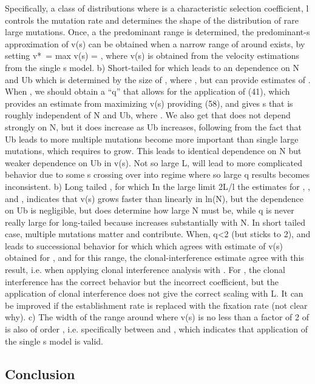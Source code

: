 \documentclass[12pt]{article}
\begin{document}
Specifically, a class of distributions where is a characteristic selection coefficient, l controls the mutation rate and determines the shape of the distribution of rare large mutations.
Once, a the predominant range is determined, the predominant-s approximation of v(s) can be obtained when a narrow range of around exists, by setting v*~= max v(s) = , where v(s) is obtained from the velocity estimations from the single s model.
 b) Short-tailed for which leads to an dependence on N and Ub which is determined by  the size of , where , but can provide estimates of .
When , we should obtain a “q” that allows for the application of (41), which provides an estimate  from maximizing v(s) providing (58), and gives s that is roughly independent of N and Ub, where .  
We also get that does not depend strongly on N, but it does increase as Ub increases, following from the fact that Ub leads to more multiple mutations become more important than single large mutations, which requires to grow.
This leads to identical dependence on N but weaker dependence on Ub in v(s).
Not so large L, will lead to more complicated behavior due to some s crossing over into regime where so large q results becomes inconsistent.
 b) Long tailed , for which 
In the large limit 2L/l the estimates for , , and , indicates that v(s) grows faster than linearly in ln(N), but the dependence on Ub is negligible, but does determine how large N must be, while q is never really large for long-tailed because  increases substantially with N.  In short tailed case, multiple mutations matter and contribute.
When, q<2 (but sticks to 2), and leads to successional behavior for which which agrees with estimate of v(s) obtained for , and for this range, the clonal-interference estimate agree with this result, i.e. when applying clonal interference analysis with .  
For , the clonal interference has the correct behavior but the incorrect coefficient, but the application of clonal interference does not give the correct scaling with L.  It can be improved if the establishment rate is replaced with the fixation rate (not clear why).
 c) The width of the range around where v(s) is no less than a factor of 2 of is also of order , i.e. specifically between and , which indicates that application of the single s model is valid.


\subsection*{Conclusion}

%
%
\end{document}
